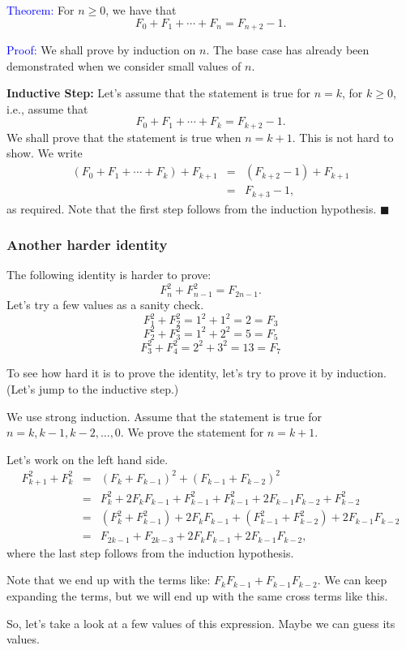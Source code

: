 \begin{frame}
  \textcolor{blue}{Theorem:} For $n\geq 0$, we have that \[ F_0+F_1+\cdots+F_n = F_{n+2}-1.\]

  \textcolor{blue}{Proof:} We shall prove by induction on $n$.  The
  base case has already been demonstrated when we consider small
  values of $n$.
  
  \vspace{0.1in}
  {\bf Inductive Step:} Let's assume that the statement is true for $n=k$, for $k\geq 0$, i.e., assume that
  \[ F_0+F_1+\cdots+F_k = F_{k+2}-1.\]
  We shall prove that the statement is true when $n=k+1$.  This is not
  hard to show.  We write
  \begin{eqnarray*}
    (F_0+F_1+\cdots+F_k)+F_{k+1} &=& (F_{k+2}-1) + F_{k+1} \\
    &=& F_{k+3} - 1,
  \end{eqnarray*}
  as required.  Note that the first step follows from the induction
  hypothesis. $\blacksquare$
\end{frame}

\begin{frame}\frametitle{Another harder identity}
  The following identity is harder to prove:
  \[ F_n^2 + F_{n-1}^2 = F_{2n-1}. \]
  Let's try a few values as a sanity check.
  \[
  F_1^2+F_2^2 = 1^2+1^2=2=F_3
  \]
  \[
  F_2^2+F_3^2 = 1^2 + 2^2 = 5 = F_5
  \]
  \[
  F_3^2+F_4^2 = 2^2 + 3^2 = 13 = F_7
  \]

  To see how hard it is to prove the identity, let's try to prove it
  by induction.  (Let's jump to the inductive step.)
\end{frame}

\begin{frame}
  We use strong induction. Assume that the statement is true for
  $n=k,k-1,k-2,\ldots,0$. We prove the statement for $n=k+1$.

  \vspace{0.1in}
  Let's work on the left hand side.
  \begin{eqnarray*}
    F_{k+1}^2 + F_{k}^2 &=&
    \left(F_k+F_{k-1}\right)^2 + \left(F_{k-1}+F_{k-2}\right)^2\\
    &=& F_k^2 + 2F_kF_{k-1} +F_{k-1}^2 + F_{k-1}^2 +  2F_{k-1}F_{k-2} + F_{k-2}^2\\
    &=& (F_k^2 + F_{k-1}^2) + 2F_kF_{k-1} + (F_{k-1}^2 + F_{k-2}^2) + 2F_{k-1}F_{k-2}\\
    &=& F_{2k-1} + F_{2k-3} + 2F_kF_{k-1} + 2F_{k-1}F_{k-2},
  \end{eqnarray*}
  where the last step follows from the induction hypothesis.

  \vspace{0.1in}
  Note that we end up with the terms like:
  $F_kF_{k-1}+F_{k-1}F_{k-2}$.  We can keep expanding the terms, but
  we will end up with the same cross terms like this.

  \vspace{0.1in} So, let's take a look at a few values of this
  expression.  Maybe we can guess its values.
\end{frame}

